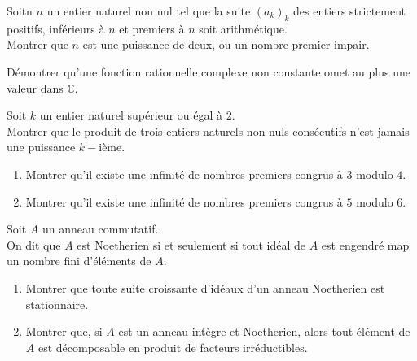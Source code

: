 \begin{exer}
Soitn $n$ un entier naturel non nul tel que la suite $(a_k)_k$ des entiers strictement positifs, %
inférieurs à $n$ et premiers à $n$ soit arithmétique.\\
Montrer que $n$ est une puissance de deux, ou un nombre premier impair.
\end{exer}

\begin{exer}
Démontrer qu'une fonction rationnelle complexe non constante omet au plus une valeur dans $\mathbb{C}$.
\end{exer}

\begin{exer}
Soit $k$ un entier naturel supérieur ou égal à $2$.\\
Montrer que le produit de trois entiers naturels non nuls consécutifs n'est jamais une puissance $k-$ième.
\end{exer}

\begin{exer}
\begin{enumerate}
\item Montrer qu'il existe une infinité de nombres premiers congrus à $3$ modulo $4$.
\item Montrer qu'il existe une infinité de nombres premiers congrus à $5$ modulo $6$.
\end{enumerate}
\end{exer}

\begin{exer}
Soit $A$ un anneau commutatif.\\
On dit que $A$ est Noetherien si et seulement si tout idéal de $A$ est engendré map un nombre fini d'éléments de $A$.
\begin{enumerate}
\item Montrer que toute suite croissante d'idéaux d'un anneau Noetherien est stationnaire.
\item Montrer que, si $A$ est un anneau intègre et Noetherien, alors tout élément de $A$ est décomposable en produit de facteurs irréductibles.
\end{enumerate}
\end{exer}